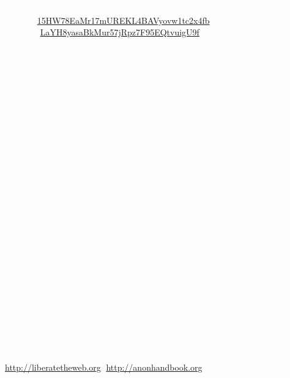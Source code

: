 \begin{center}
\pagecolor{black}
\textcolor{white}{\Large{Как обойти Великий Российский Файрвол}}\\
\vspace{3em}
\textcolor{white}{Bitcoin: \href{bitcoin:15HW78EaMr17mUREKL4BAVyovw1tc2x4fb}{15HW78EaMr17mUREKL4BAVyovw1tc2x4fb}}\\
\textcolor{white}{Litecoin: \href{litecoin:LaYH8yasaBkMur57jRpz7F95EQtvuigU9f}{LaYH8yasaBkMur57jRpz7F95EQtvuigU9f}}
\vspace{8em}
\scriptsize
\begin{alltt}
\begin{center}
\textcolor{white}{-----BEGIN PGP PUBLIC KEY BLOCK-----

mQENBFH98/gBCADTDUzlDKqTru/l7U4vLIRdGb39iOdZr48wu2gSqsyGjDH+sHxI
kKRM2UJ64CsRWjq8NVqQsc/dDysrIYyr8Hcqwf3WAKR2pKZHUOE2c1+PSyZr9/sD
5Nvu6d8QhAJ4aQjKeViyiwIc29u5Ovt34Ezwa55t44ynwSPlyK8q2qM4ufn1TWuc
pOVJXGzxzMi0XPmlQcY+rSrpXt9UZahgE/1V1ZT13a0veNrL3uEaZVAJQvvPdM1O
wBcptEsjcNWkNfv7CLFzTP6rhfgrPqj3BAbRzEOEx9WDMOWiponHgPGf2HKzKqOt
RVesjHBDzYWMBEwO5uXcI1xw5yIBLHx3gkEvABEBAAG0LUxpYmVyYXRlIHRoZSBX
ZWIgPGxpYmVyYXRldGhld2ViQHRvcm1haWwub3JnPokBOAQTAQIAIgUCUf3z+AIb
AwYLCQgHAwIGFQgCCQoLBBYCAwECHgECF4AACgkQVArfrg30FQQ42wf/XtC9FP2j
lSACMd2db9CWZI4LB5f15moUXqzJigHySMv+qDrilCxkhqS5m7EGVlOAEcOfwGFB
tijKWlcMcpDlHJyIUwaBvAKC2kWk8bes0NFD2IEUYuWUoR/9nru6U5meB93zgsa2
E6t6mr9aDM0TcHo+gNhJ9CjzMyr5JluxMvtaKMqdAXJVYT03zpysmD3hE+QjmMQf
gf2XcK110zxWMyyzbpWD1Ozw6tRYOQWIIJpysjt69OnoM42Bl+vzauzJS4hXOEKn
Y70iQIgEDyYzEyRRDNGZhgFb1A0ziFVHjdQlWnkn/kjBNzeYlE6vj7pSWFbvpKaB
aJXrSkZXwSe4c7kBDQRR/fP4AQgA0emEkOWfcnwQsUgRAfiyef8cNtmaGcmZ5O5J
ua56jQ1e9Zf8cWS/Yt3NdLUDIFTa8m3wu7oVfEsrV/5h2GwzKd+48iFSukwGJm4w
hNsSCizXkk/APVW+NBcNsrfOnJs4BWw9avmNnGHFFcyGkNlFoQIHhGSLZZx7Qn48
Wh1Npv05axIFvLRg1zR9oDkWsuASdg4kfTqmrQ17uwtUfoNoYA2vwyf98rb1pekl
OGDdmoeskLzuF/E3VkXW+XpwItI4wGeHiahPlY7r4hpRqgLEUUCN323E6w7byifC
/tfmaPwByQNapcNDuu/YlRUt0GXM0wioDbrPcbirTMHB5z2/DQARAQABiQEfBBgB
AgAJBQJR/fP4AhsMAAoJEFQK364N9BUEQJUH/RMoyqwWXKJkmrhY9lX9m+0GUhYg
TirLh19RpKEW1NJLbMdQ3Q+t2vx+aTubXN9wwiIk7JaoM+/644F0+r/Xny9m7OyR
xDaQpHjcWFoeEcA+5YWeqteZ3TdHfj+R9zbypcebolQUA91mvF+V+MJSST1B6Uw9
hV0f3DMOQtlOddidu/GcWkQntChh0iqHIegW4zjj91RBsYm35FoLZu4O4wjDcghi
s9inHgJHYZznTiCyoHgDsRmT4pCLwGRyjS9DgVkpzqTM9VPXqiKrxaqkgGF9M8C6
T6s07CF9bbooBenbVkC5L29nwetvZL3dVQ/6N7qz2I3jeoyUiKG9MSotLZc=
=LBzI
-----END PGP PUBLIC KEY BLOCK-----}
\end{center}
\end{alltt}
\normalsize
\vfill
\textcolor{white}{\Large{Liberate the Web, 2013}}\\
\textcolor{white}{\url{http://liberatetheweb.org}, \url{http://anonhandbook.org}}
\vspace{2em}
\begin{figure}[h]
\end{figure}
\end{center}
